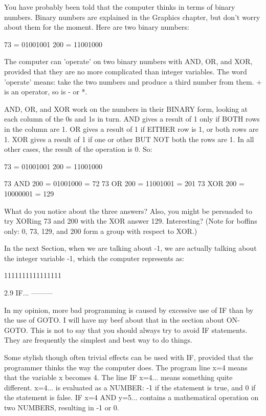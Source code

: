 You  have  probably  been told that the computer thinks  in  terms  of  binary 
numbers. Binary numbers are explained in the Graphics chapter, but don't worry 
about them for the moment. Here are two binary numbers:

         73 = 01001001
        200 = 11001000

The  computer  can  'operate' on two binary numbers with  AND,  OR,  and  XOR, 
provided  that they are no more complicated than integer variables.  The  word 
'operate' means: take the two numbers and produce a third number from them.  + 
is an operator, so is - or *.

AND,  OR,  and XOR work on the numbers in their BINARY form, looking  at  each 
column of the 0s and 1s in turn. AND gives a result of 1 only if BOTH rows  in 
the column are 1. OR gives a result of 1 if EITHER row is 1, or both rows  are 
1. XOR gives a result of 1 if one or other BUT NOT both the rows are 1. In all 
other cases, the result of the operation is 0. So:

         73 = 01001001
        200 = 11001000

        73 AND 200 = 01001000 =  72
        73  OR 200 = 11001001 = 201
        73 XOR 200 = 10000001 = 129

What  do you notice about the three answers? Also, you might be  persuaded  to 
try XORing 73 and 200 with the XOR answer 129. Interesting? (Note for  boffins 
only: 0, 73, 129, and 200 form a group with respect to XOR.)

In  the  next Section, when we are talking about -1, we are  actually  talking 
about the integer variable -1, which the computer represents as:

        1111111111111111


2.9 IF...
---------

In  my opinion, more bad programming is caused by excessive use of IF than  by 
the use of GOTO. I will have my beef about that in the section about  ON-GOTO. 
This is not to say that you should always try to avoid IF statements. They are 
frequently the simplest and best way to do things.

Some  stylish though often trivial effects can be used with IF, provided  that 
the  programmer thinks the way the computer does. The program line  x=4  means 
that  the  variable  x becomes 4. The line IF  x=4...  means  something  quite 
different. x=4... is evaluated as a NUMBER: -1 if the statement is true, and 0 
if the statement is false. IF x=4 AND y=5... contains a mathematical operation 
on two NUMBERS, resulting in -1 or 0.

